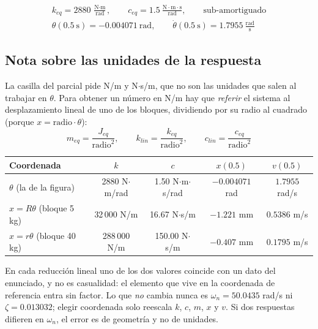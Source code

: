 \documentclass[12pt,letterpaper]{article}
\begin{document}
\begin{equation}
\boxed{
\begin{gathered}
k_{eq} = 2880\ \tfrac{\text{N}\cdot\text{m}}{\text{rad}}, \qquad
c_{eq} = 1.5\ \tfrac{\text{N}\cdot\text{m}\cdot\text{s}}{\text{rad}}, \qquad
\text{sub-amortiguado} \\[4pt]
\theta(0.5\ \text{s}) = -0.004071\ \text{rad}, \qquad
\dot{\theta}(0.5\ \text{s}) = 1.7955\ \tfrac{\text{rad}}{\text{s}}
\end{gathered}}
\end{equation}

\subsection{Nota sobre las unidades de la respuesta}

La casilla del parcial pide N/m y N$\cdot$s/m, que no son las unidades que salen al
trabajar en $\theta$. Para obtener un número en N/m hay que \emph{referir} el sistema
al desplazamiento lineal de uno de los bloques, dividiendo por su radio al cuadrado
(porque $x = \text{radio}\cdot\theta$):
\begin{equation}
m_{eq} = \frac{J_{eq}}{\text{radio}^2}, \qquad
k_{lin} = \frac{k_{eq}}{\text{radio}^2}, \qquad
c_{lin} = \frac{c_{eq}}{\text{radio}^2}
\end{equation}

\begin{center}
\begin{tabular}{lcccc}
\toprule
\textbf{Coordenada} & $k$ & $c$ & $x(0.5)$ & $v(0.5)$ \\
\midrule
$\theta$ (la de la figura) & 2880 N$\cdot$m/rad & 1.50 N$\cdot$m$\cdot$s/rad & $-0.004071$ rad & $1.7955$ rad/s \\
$x = R\theta$ (bloque 5 kg)  & 32\,000 N/m  & 16.67 N$\cdot$s/m & $-1.221$ mm & $0.5386$ m/s \\
$x = r\theta$ (bloque 40 kg) & 288\,000 N/m & 150.00 N$\cdot$s/m & $-0.407$ mm & $0.1795$ m/s \\
\bottomrule
\end{tabular}
\end{center}

En cada reducción lineal uno de los dos valores coincide con un dato del enunciado, y
no es casualidad: el elemento que vive en la coordenada de referencia entra sin
factor. Lo que \emph{no} cambia nunca es $\omega_n = 50.0435$ rad/s ni
$\zeta = 0.013032$; elegir coordenada solo reescala $k$, $c$, $m$, $x$ y $v$. Si dos
respuestas difieren en $\omega_n$, el error es de geometría y no de unidades.
\end{document}
